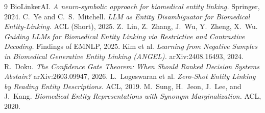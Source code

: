 \documentclass[11pt]{article}
\begin{document}
\begin{thebibliography}{9}
 BioLinkerAI. \emph{A neuro-symbolic approach
for biomedical entity linking.} Springer, 2024.
 C.\ Ye and C.\ S.\ Mitchell. \emph{LLM as Entity
Disambiguator for Biomedical Entity-Linking.} ACL (Short), 2025.
 Z.\ Lin, Z.\ Zhang, J.\ Wu, Y.\ Zheng, X.\ Wu.
\emph{Guiding LLMs for Biomedical Entity Linking via Restrictive and Contrastive
Decoding.} Findings of EMNLP, 2025.
 Kim et al. \emph{Learning from Negative Samples in
Biomedical Generative Entity Linking (ANGEL).} arXiv:2408.16493, 2024.
 R.\ Doku. \emph{The Confidence Gate Theorem: When Should
Ranked Decision Systems Abstain?} arXiv:2603.09947, 2026.
 L.\ Logeswaran et al. \emph{Zero-Shot
Entity Linking by Reading Entity Descriptions.} ACL, 2019.
 M.\ Sung, H.\ Jeon, J.\ Lee, and J.\ Kang.
\emph{Biomedical Entity Representations with Synonym Marginalization.} ACL, 2020.
\end{thebibliography}
\end{document}
